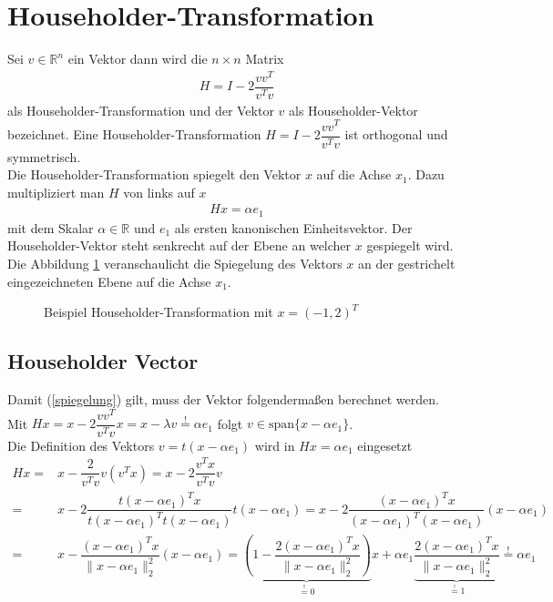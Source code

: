 \section{Householder-Transformation}
Sei  $v \in \mathbb{R}^n$ ein Vektor dann wird die $n \times n$ Matrix 
\begin{align}
	H = I - 2 \dfrac{vv^T}{v^Tv}
\end{align}
als Householder-Transformation und der Vektor $v$ als Householder-Vektor bezeichnet.
Eine Householder-Transformation $H = I - 2 \dfrac{vv^T}{v^Tv}$ ist orthogonal und symmetrisch. \cite{num1}\\
Die Householder-Transformation spiegelt den Vektor $x$ auf die Achse $x_1$.
Dazu multipliziert man $H$ von links auf $x$
\begin{align}
	Hx=\alpha e_1 \label{spiegelung}
\end{align}
mit dem Skalar $\alpha \in \mathbb{R}$ und $e_1$ als ersten kanonischen Einheitsvektor. Der Householder-Vektor steht senkrecht auf der Ebene an welcher $x$ gespiegelt wird.\\
Die Abbildung \ref{fig:HHolder} veranschaulicht die Spiegelung des Vektors $x$ an der gestrichelt eingezeichneten Ebene auf die Achse $x_1$.
\begin{figure}[H]
	\centering
	
	\caption{Beispiel Householder-Transformation mit $x=(-1,2)^T$}
	\label{fig:HHolder}
\end{figure}




\subsection{Householder Vector}
Damit (\ref{spiegelung}) gilt, muss der Vektor folgendermaßen berechnet werden. \\
Mit $Hx = x - 2\dfrac{vv^T}{v^Tv} x = x - \lambda v \overset{!}{=} \alpha e_1$ folgt $v \in \text{span}\{x - \alpha e_1\}$. \cite{num1}\\
Die Definition des Vektors $v = t(x - \alpha e_1)$ wird in $Hx = \alpha e_1 $ eingesetzt
\begin{align*}
	Hx =& x - \dfrac{2}{v^Tv}v(v^Tx) = x - 2\dfrac{v^Tx}{v^Tv}v\\
	=& x - 2\dfrac{ t(x - \alpha e_1)^Tx}{ t(x - \alpha e_1)^T t(x - \alpha e_1)} t(x - \alpha e_1)
	= x - 2\dfrac{ (x - \alpha e_1)^Tx}{ (x - \alpha e_1)^T (x - \alpha e_1)} (x - \alpha e_1)
	\\
	=& x - \dfrac{(x - \alpha e_1)^Tx}{\|x - \alpha e_1\|_2^2} (x - \alpha e_1)
	=\underbrace{\left(1 - \dfrac{2(x - \alpha e_1)^Tx}{\|x - \alpha e_1\|_2^2}\right)}_{ \overset{!}{=} 0 } x + \alpha e_1 \underbrace{\dfrac{2(x - \alpha e_1)^Tx}{\|x - \alpha e_1\|_2^2} }_{\overset{!}{=} 1} \overset{!}{=} \alpha e_1
\end{align*}

